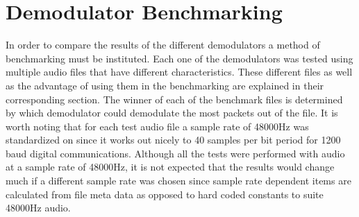 \chapter{Demodulator Benchmarking}
In order to compare the results of the different demodulators a method of benchmarking must be instituted. Each one of the demodulators was tested using multiple audio files that have different characteristics. These different files as well as the advantage of using them in the benchmarking are explained in their corresponding section. The winner of each of the benchmark files is determined by which demodulator could demodulate the most packets out of the file. It is worth noting that for each test audio file a sample rate of 48000Hz was standardized on since it works out nicely to 40 samples per bit period for 1200 baud digital communications. Although all the tests were performed with audio at a sample rate of 48000Hz, it is not expected that the results would change much if a different sample rate was chosen since sample rate dependent items are calculated from file meta data as opposed to hard coded constants to suite 48000Hz audio. 

